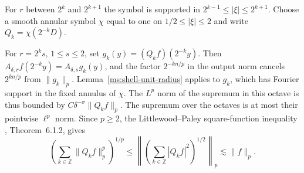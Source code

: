 For $r$ between $2^k$ and $2^{k+1}$ the symbol is supported in $2^{k-1}\le|\xi|\le2^{k+1}$. Choose a smooth annular symbol $\chi$ equal to one on $1/2\le|\xi|\le2$ and write $Q_k=\chi(2^{-k}D)$.

For $r=2^ks$, $1\le s\le2$, set $g_k(y)=(Q_k f)(2^{-k}y)$. Then $A_{\delta,r}f(2^{-k}y)=A_{\delta,s}g_k(y)$, and the factor $2^{-kn/p}$ in the output norm cancels $2^{kn/p}$ from $\|g_k\|_p$. Lemma~\ref{ms:shell-unit-radius} applies to $g_k$, which has Fourier support in the fixed annulus of $\chi$. The $L^p$ norm of the supremum in this octave is thus bounded by $C\delta^{-\sigma}\|Q_k f\|_p$. The supremum over the octaves is at most their pointwise $\ell^p$ norm. Since $p\ge2$, the Littlewood--Paley square-function inequality \cite{r-32}, Theorem~6.1.2, gives
\[
 \left(\sum_{k\in\mathbb Z}\|Q_k f\|_p^p\right)^{1/p}
 \le\left\|\left(\sum_{k\in\mathbb Z}|Q_k f|^2\right)^{1/2}\right\|_p
 \lesssim\|f\|_p.
\]
